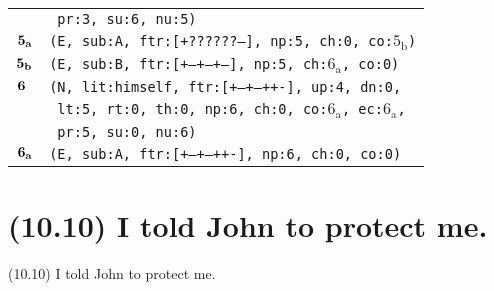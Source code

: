 \documentclass{article}
\begin{document}
\begin{minipage}{\textwidth}
{\begin{tabular}{|r|l|}
    & \texttt{\texttt{~pr:3,~su:6,~nu:5)}} \\
    ${\textbf{\textrm{5}}_{\textbf{\textrm{a}}}}$ & \texttt{\texttt{(E,~sub:A,~ftr:[+??????--],~np:5,~ch:0,~co:${\textrm{5}_{\textrm{b}}}$)}} \\
    ${\textbf{\textrm{5}}_{\textbf{\textrm{b}}}}$ & \texttt{\texttt{(E,~sub:B,~ftr:[+--+--+--],~np:5,~ch:${\textrm{6}_{\textrm{a}}}$,~co:0)}} \\
    ${\textbf{\textrm{6}}_{\phantom{z}}}$ & \texttt{\texttt{(N,~lit:himself,~ftr:[+--+--++-],~up:4,~dn:0,}} \\
    & \texttt{\texttt{~lt:5,~rt:0,~th:0,~np:6,~ch:0,~co:${\textrm{6}_{\textrm{a}}}$,~ec:${\textrm{6}_{\textrm{a}}}$,}} \\
    & \texttt{\texttt{~pr:5,~su:0,~nu:6)}} \\
    ${\textbf{\textrm{6}}_{\textbf{\textrm{a}}}}$ & \texttt{\texttt{(E,~sub:A,~ftr:[+--+--++-],~np:6,~ch:0,~co:0)}} \\
    \hline
  \end{tabular}
  }
\end{minipage}
\bigbreak

\clearpage

%
%

\section*{(10.10) I told John to protect me.}

\bigbreak
\begin{enumerate*}
\item[(10.10)] I told John to protect me.
\end{enumerate*}
\bigbreak
\end{document}
